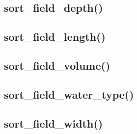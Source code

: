 \documentclass[12pt, a4paper]{article}
\begin{document}
\subsection{sort\_field\_depth()}







\subsection{sort\_field\_length()}







\subsection{sort\_field\_volume()}







\subsection{sort\_field\_water\_type()}







\subsection{sort\_field\_width()}
\end{document}
